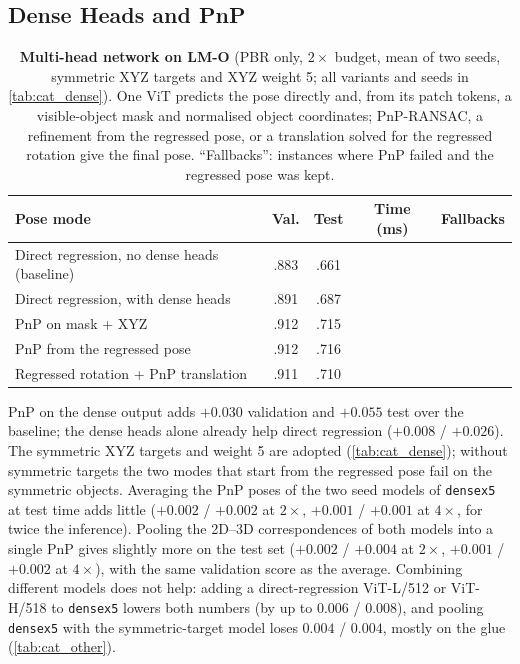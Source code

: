 \subsection{Dense Heads and PnP}
\label{sec:acc:dense}
\begin{table}[t]
  \centering
  \small
  \begin{tabular}{@{}lcccc@{}}
    \toprule
    Pose mode & Val. & Test & Time (ms) & Fallbacks \\
    \midrule
    Direct regression, no dense heads (baseline) & .883 & .661 & & \\
    Direct regression, with dense heads & .891 & .687 & & \\
    PnP on mask + XYZ & .912 & .715 & & \\
    PnP from the regressed pose & .912 & .716 & & \\
    Regressed rotation + PnP translation & .911 & .710 & & \\
    \bottomrule
  \end{tabular}
  \caption{\textbf{Multi-head network on LM-O} (PBR only, $2\times$ budget, mean of two seeds, symmetric XYZ targets and XYZ weight 5; all variants and seeds in \cref{tab:cat_dense}). One ViT predicts the
  pose directly and, from its patch tokens, a visible-object mask and normalised object
  coordinates; PnP-RANSAC, a refinement from the regressed pose, or a translation solved for the
  regressed rotation give the final pose. ``Fallbacks'': instances where PnP failed and the
  regressed pose was kept.}
  \label{tab:acc_dense}
\end{table}
PnP on the dense output adds $+0.030$ validation and $+0.055$ test over the baseline; the dense heads
alone already help direct regression ($+0.008$ / $+0.026$). The symmetric XYZ targets and weight 5
are adopted (\cref{tab:cat_dense}); without symmetric targets the two modes that start from the
regressed pose fail on the symmetric objects. Averaging the PnP poses of the two seed models of
\texttt{densex5} at test time adds little ($+0.002$ / $+0.002$ at $2\times$, $+0.001$ / $+0.001$ at
$4\times$, for twice the inference). Pooling the 2D--3D correspondences of both models into a single
PnP gives slightly more on the test set ($+0.002$ / $+0.004$ at $2\times$, $+0.001$ / $+0.002$ at
$4\times$), with the same validation score as the average. Combining different models does not help:
adding a direct-regression ViT-L/512 or ViT-H/518 to \texttt{densex5} lowers both numbers (by up to
$0.006$ / $0.008$), and pooling \texttt{densex5} with the symmetric-target model loses
$0.004$ / $0.004$, mostly on the glue (\cref{tab:cat_other}).

